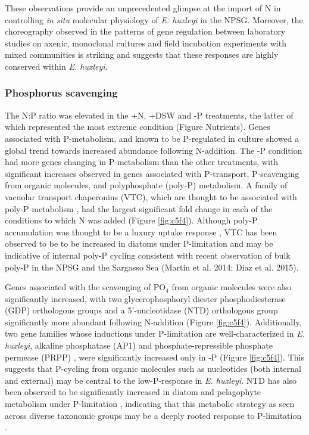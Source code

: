These observations provide an unprecedented glimpse at the import of N in controlling \textit{in situ} molecular physiology of \textit{E. huxleyi} in the NPSG. Moreover, the choreography observed in the patterns of gene regulation between laboratory studies on axenic, monoclonal cultures and field incubation experiments with mixed communities is striking and suggests that these responses are highly conserved within \textit{E. huxleyi}. \par


\subsubsection{Phosphorus scavenging}

The N:P ratio was elevated in the +N, +DSW and -P treatments, the latter of which represented the most extreme condition (Figure Nutrients). Genes associated with P-metabolism, and known to be P-regulated in culture \citep{Dyhrman2006, McKew2015} showed a global trend towards increased abundance following N-addition. The -P condition had more genes changing in P-metabolism than the other treatments, with significant increases observed in genes associated with P-transport, P-scavenging from organic molecules, and polyphosphate (poly-P) metabolism. A family of vacuolar transport chaperonins (VTC), which are thought to be associated with poly-P metabolism \citep{Ogawa2000, Hothorn2009, Dyhrman2012}, had the largest significant fold change in each of the conditions to which N was added (Figure \ref{fig:c5f4}). Although poly-P accumulation was thought to be a luxury uptake response \citep{Perry1976}, VTC has been observed to be to be increased in diatoms under P-limitation \citep{Dyhrman2006, Dyhrman2012} and may be indicative of internal poly-P cycling consistent with recent observation of bulk poly-P in the NPSG and the Sargasso Sea (Martin et al. 2014; Diaz et al. 2015). \par

Genes associated with the scavenging of PO$_4$ from organic molecules were also significantly increased, with two glycerophosphoryl diester phosphodiesterase (GDP) orthologous groups and a 5'-nucleotidase (NTD) orthologous group significantly more abundant following N-addition (Figure \ref{fig:c5f4}). Additionally, two gene families whose inductions under P-limitation are well-characterized in \textit{E. huxleyi}, alkaline phosphatase (AP1) \citep{Xu2006} and phosphate-repressible phosphate permease (PRPP) \citep{Chung2003, Dyhrman2003, Dyhrman2006}, were significantly increased only in -P (Figure \ref{fig:c5f4}). This suggests that P-cycling from organic molecules such as nucleotides (both internal and external) may be central to the low-P-response in \textit{E. huxleyi}. NTD has also been observed to be significantly increased in diatom and pelagophyte metabolism under P-limitation \citep{Wurch2011a, Dyhrman2012}, indicating that this metabolic strategy as seen across diverse taxonomic groups may be a deeply rooted response to P-limitation \citep{Martiny2013}.\par

